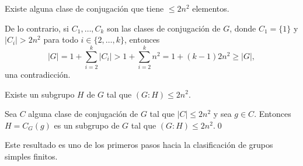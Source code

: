 \begin{claim}
Existe alguna clase de conjugación que tiene $\leq 2n^2$ elementos.
\end{claim}

De lo contrario, si $C_1,\dots,C_k$ son las clases de conjugación de $G$, donde 
$C_1=\{1\}$ y $|C_i|>2n^2$ para todo $i\in\{2,\dots,k\}$, entonces 
\[
|G|=1+\sum_{i=2}^k|C_i|>1+\sum_{i=2}^kn^2=1+(k-1)2n^2\geq |G|,
\]
una contradicción. 

\begin{claim}
Existe un subgrupo $H$ de $G$ tal que $(G:H)\leq 2n^2$.
\end{claim}

Sea $C$ alguna clase de conjugación de $G$ tal que $|C|\leq 2n^2$ y sea $g\in C$.  
Entonces $H=C_G(g)$ es un subgrupo de $G$ tal que $(G:H)\leq 2n^2$.\qed

\medskip
Este resultado es uno de los primeros pasos hacia la clasificación de grupos simples finitos. 